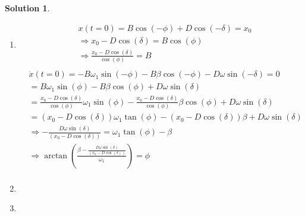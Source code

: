 \documentclass[10pt]{article}
\theoremstyle{definition}
\newtheorem{soln}{Solution}
\begin{document}
\begin{soln}
      \begin{enumerate}[label=(\alph*)]
            \item \begin{align*}
                         & x(t=0)=B\cos\left(-\phi\right)+D\cos\left(-\delta\right)=x_0             \\
                         & \Rightarrow x_0-D\cos\left(\delta\right)=B\cos\left(\phi\right)          \\
                         & \Rightarrow \frac{x_0-D\cos\left(\delta\right)}{\cos\left(\phi\right)}=B \\
                  \end{align*}
                  \begin{align*}
                         & \dot{x}(t=0)=-B\omega_1\sin\left(-\phi\right)-B\beta\cos\left(-\phi\right)-D\omega\sin\left(-\delta\right)=0                                                                                                 \\
                         & =B\omega_1\sin\left(\phi\right)-B\beta\cos\left(\phi\right)+D\omega\sin\left(\delta\right)                                                                                                                   \\
                         & =\frac{x_0-D\cos\left(\delta\right)}{\cos\left(\phi\right)}\omega_1\sin\left(\phi\right)-\frac{x_0-D\cos\left(\delta\right)}{\cos\left(\phi\right)}\beta\cos\left(\phi\right)+D\omega\sin\left(\delta\right) \\
                         & =\left(x_0-D\cos\left(\delta\right)\right)\omega_1\tan\left(\phi\right)-\left(x_0-D\cos\left(\delta\right)\right)\beta+D\omega\sin\left(\delta\right)                                                        \\
                         & \Rightarrow -\frac{D\omega\sin\left(\delta\right)}{\left(x_0-D\cos\left(\delta\right)\right)}=\omega_1\tan\left(\phi\right)-\beta                                                                            \\
                         & \Rightarrow \arctan\left(\frac{\beta-\frac{D\omega\sin\left(\delta\right)}{\left(x_0-D\cos\left(\delta\right)\right)}}{\omega_1}\right)=\phi                                                                 \\
                  \end{align*}

            \item \inputminted[breaklines, autogobble]{python3}{./python/q1/q1b.py} %
                  \newpage
            \item \inputminted[breaklines, autogobble]{python3}{./python/q1/q1c.py}


\end{enumerate}
\end{soln}
\end{document}
